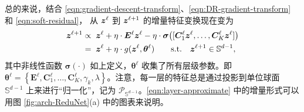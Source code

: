 \documentclass[../../book-main.tex]{subfiles}
\begin{document}
总的来说，结合 \eqref{eqn:gradient-descent-transform}、\eqref{eqn:DR-gradient-transform} 和 \eqref{eqn:soft-residual}，
从 $\bm{z}^{\ell}$ 到 $\bm{z}^{\ell+1}$ 的增量特征变换现在变为
\begin{equation}\label{eqn:layer-approximate}
\begin{aligned}
\bm{z}^{\ell+1}  &\propto \; \bm{z}^\ell +  \eta \cdot  \bm E^{\ell} \bm{z}^{\ell} - \eta\cdot  \bm \sigma\big([\bm{C}^{\ell}_{1} \bm{z}^{\ell}, \dots, \bm{C}^{\ell}_{K} \bm{z}^{\ell}]\big)  \\
&= \; \bm{z}^\ell +  \eta \cdot g(\bm{z}^\ell, \bm \theta^\ell) \qquad \mbox{s.t.} \quad \bm{z}^{\ell +1} \in \mathbb{S}^{d-1},
\end{aligned}
\end{equation}
其中非线性函数 $\bm \sigma(\cdot)$ 如上定义，$\bm \theta^\ell$ 收集了所有层级参数。即 $\bm \theta^\ell =\left\{\bm E^\ell, \bm{C}^{\ell}_{1}, \dots, \bm{C}^{\ell}_{K}, \gamma_{k}, \lambda\right\}$。注意，每一层的特征总是通过投影到单位球面 $\mathbb S^{d-1}$ 上来进行“归一化”，记为 $\mathcal P_{\mathbb S^{d-1}}$。\eqref{eqn:layer-approximate} 中的增量形式可以用图 \ref{fig:arch-ReduNet}(a) 中的图表来说明。
\end{document}
